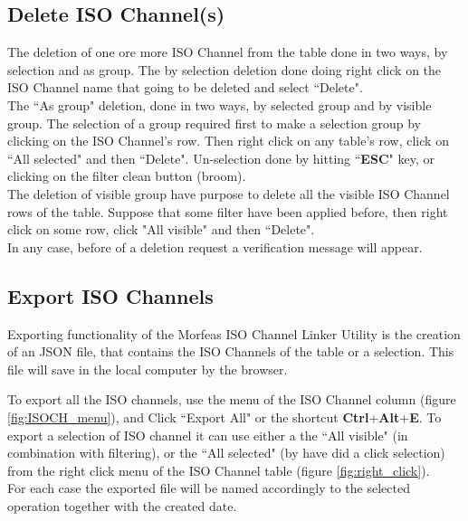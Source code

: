 \newpage
\subsection{Delete ISO Channel(s)}
The deletion of one ore more ISO Channel from the table done in two ways, by selection and as group.
The by selection deletion done doing right click on the ISO Channel name that going to be deleted and select ``Delete".\\

The ``As group" deletion, done in two ways, by selected group and by visible group.
The selection of a group required first to make a selection group by clicking on the ISO Channel's row.
Then right click on any table's row, click on ``All selected" and then ``Delete".
Un-selection done by hitting ``\textbf{ESC}" key, or clicking on the filter clean button (broom).\\

The deletion of visible group have purpose to delete all the visible ISO Channel rows of the table.
Suppose that some filter have been applied before, then right click on some row, click "All visible" and then ``Delete".\\

In any case, before of a deletion request a verification message will appear.

\subsection{Export ISO Channels}
Exporting functionality of the Morfeas ISO Channel Linker Utility is the creation of an JSON file,
that contains the ISO Channels of the table or a selection. This file will save in the local computer by the browser.

To export all the ISO channels, use the menu of the ISO Channel column (figure \ref{fig:ISOCH_menu}),
 and Click ``Export All" or the shortcut \textbf{Ctrl}+\textbf{Alt}+\textbf{E}.
To export a selection of ISO channel it can use either a the ``All visible" (in combination with filtering),
or the ``All selected" (by have did a click selection) from the right click menu of the ISO Channel table (figure \ref{fig:right_click}).\\

For each case the exported file will be named accordingly to the selected operation together with the created date.

